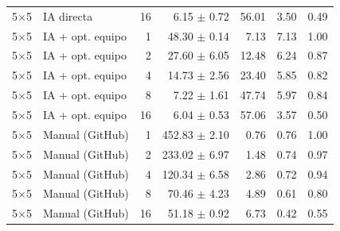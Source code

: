\begin{tabular}{llrrrrr}
5$\times$5 & IA directa & 16 & 6.15 $\pm$ 0.72 & 56.01 & 3.50 & 0.49 \\
5$\times$5 & IA + opt. equipo & 1 & 48.30 $\pm$ 0.14 & 7.13 & 7.13 & 1.00 \\
5$\times$5 & IA + opt. equipo & 2 & 27.60 $\pm$ 6.05 & 12.48 & 6.24 & 0.87 \\
5$\times$5 & IA + opt. equipo & 4 & 14.73 $\pm$ 2.56 & 23.40 & 5.85 & 0.82 \\
5$\times$5 & IA + opt. equipo & 8 & 7.22 $\pm$ 1.61 & 47.74 & 5.97 & 0.84 \\
5$\times$5 & IA + opt. equipo & 16 & 6.04 $\pm$ 0.53 & 57.06 & 3.57 & 0.50 \\
5$\times$5 & Manual (GitHub) & 1 & 452.83 $\pm$ 2.10 & 0.76 & 0.76 & 1.00 \\
5$\times$5 & Manual (GitHub) & 2 & 233.02 $\pm$ 6.97 & 1.48 & 0.74 & 0.97 \\
5$\times$5 & Manual (GitHub) & 4 & 120.34 $\pm$ 6.58 & 2.86 & 0.72 & 0.94 \\
5$\times$5 & Manual (GitHub) & 8 & 70.46 $\pm$ 4.23 & 4.89 & 0.61 & 0.80 \\
5$\times$5 & Manual (GitHub) & 16 & 51.18 $\pm$ 0.92 & 6.73 & 0.42 & 0.55 \\
\bottomrule
\end{tabular}
